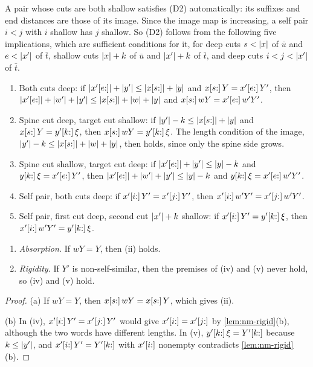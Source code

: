 A pair whose cuts are both shallow satisfies (D2) automatically: its suffixes
and end distances are those of its image. Since the image map is increasing, a self
pair $i<j$ with $i$ shallow has $j$ shallow. So (D2) follows from the
following five implications, which are sufficient conditions for it, for deep
cuts $s<\lvert x\rvert$ of $\bar u$ and $e<\lvert x'\rvert$ of
$\bar t$, shallow cuts $\lvert x\rvert+k$ of $\bar u$ and $\lvert x'\rvert+k$ of $\bar t$, and
deep cuts $i<j<\lvert x'\rvert$ of $\bar t$.
\begin{enumerate}[label=(\roman*),leftmargin=*]
\item Both cuts deep: if $\lvert x'[e{:}]\rvert+\lvert y'\rvert\le\lvert x[s{:}]\rvert+\lvert y\rvert$ and
  $x[s{:}]\,Y=x'[e{:}]\,Y'$, then
  $\lvert x'[e{:}]\rvert+\lvert w'\rvert+\lvert y'\rvert\le\lvert x[s{:}]\rvert+\lvert w\rvert+\lvert y\rvert$ and
  $x[s{:}]\,wY=x'[e{:}]\,w'Y'$.
\item Spine cut deep, target cut shallow: if
  $\lvert y'\rvert-k\le\lvert x[s{:}]\rvert+\lvert y\rvert$ and $x[s{:}]\,Y=y'[k{:}]\,\xi$, then
  $x[s{:}]\,wY=y'[k{:}]\,\xi$. The length condition of the image,
  $\lvert y'\rvert-k\le\lvert x[s{:}]\rvert+\lvert w\rvert+\lvert y\rvert$, then holds, since only the spine
  side grows.
\item Spine cut shallow, target cut deep: if
  $\lvert x'[e{:}]\rvert+\lvert y'\rvert\le\lvert y\rvert-k$ and $y[k{:}]\,\xi=x'[e{:}]\,Y'$,
  then $\lvert x'[e{:}]\rvert+\lvert w'\rvert+\lvert y'\rvert\le\lvert y\rvert-k$ and
  $y[k{:}]\,\xi=x'[e{:}]\,w'Y'$.
\item Self pair, both cuts deep: if $x'[i{:}]\,Y'=x'[j{:}]\,Y'$, then
  $x'[i{:}]\,w'Y'=x'[j{:}]\,w'Y'$.
\item Self pair, first cut deep, second cut $\lvert x'\rvert+k$ shallow: if
  $x'[i{:}]\,Y'=y'[k{:}]\,\xi$, then $x'[i{:}]\,w'Y'=y'[k{:}]\,\xi$.
\end{enumerate}

\begin{lemma}\label{lem:nm-dischargers}
\leavevmode
\begin{enumerate}[label=(\alph*)]
\item \emph{Absorption.} If $wY=Y$, then \textup{(ii)} holds.
\item \emph{Rigidity.} If $Y'$ is non-self-similar, then the premises of
\textup{(iv)} and \textup{(v)} never hold, so \textup{(iv)} and \textup{(v)}
hold.
\end{enumerate}
\end{lemma}

\begin{proof}
(a) If $wY=Y$, then $x[s{:}]\,wY=x[s{:}]\,Y$, which gives (ii).

(b) In (iv), $x'[i{:}]\,Y'=x'[j{:}]\,Y'$ would give $x'[i{:}]=x'[j{:}]$ by
\cref{lem:nm-rigid}(b), although the two words have different lengths. In (v),
$y'[k{:}]\,\xi=Y'[k{:}]$ because $k\le\lvert y'\rvert$, and
$x'[i{:}]\,Y'=Y'[k{:}]$ with $x'[i{:}]$ nonempty contradicts
\cref{lem:nm-rigid}(b).
\end{proof}

